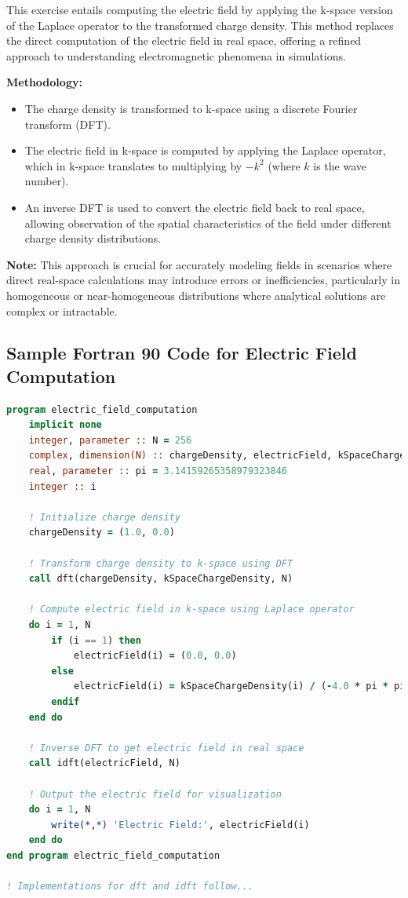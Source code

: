 \documentclass{article}
\begin{document}
This exercise entails computing the electric field by applying the k-space version of the Laplace operator to the transformed charge density. This method replaces the direct computation of the electric field in real space, offering a refined approach to understanding electromagnetic phenomena in simulations.

\vspace{3mm}

\textbf{Methodology:}
\begin{itemize}
    \item The charge density is transformed to k-space using a discrete Fourier transform (DFT).
    \item The electric field in k-space is computed by applying the Laplace operator, which in k-space translates to multiplying by $-k^2$ (where $k$ is the wave number).
    \item An inverse DFT is used to convert the electric field back to real space, allowing observation of the spatial characteristics of the field under different charge density distributions.
\end{itemize}

\textbf{Note:}
This approach is crucial for accurately modeling fields in scenarios where direct real-space calculations may introduce errors or inefficiencies, particularly in homogeneous or near-homogeneous distributions where analytical solutions are complex or intractable.

\subsection*{Sample Fortran 90 Code for Electric Field Computation}
\begin{lstlisting}[language=fortran]
program electric_field_computation
    implicit none
    integer, parameter :: N = 256
    complex, dimension(N) :: chargeDensity, electricField, kSpaceChargeDensity
    real, parameter :: pi = 3.14159265358979323846
    integer :: i

    ! Initialize charge density
    chargeDensity = (1.0, 0.0)

    ! Transform charge density to k-space using DFT
    call dft(chargeDensity, kSpaceChargeDensity, N)

    ! Compute electric field in k-space using Laplace operator
    do i = 1, N
        if (i == 1) then
            electricField(i) = (0.0, 0.0)
        else
            electricField(i) = kSpaceChargeDensity(i) / (-4.0 * pi * pi * (real(i - 1)/real(N))**2)
        endif
    end do

    ! Inverse DFT to get electric field in real space
    call idft(electricField, N)

    ! Output the electric field for visualization
    do i = 1, N
        write(*,*) 'Electric Field:', electricField(i)
    end do
end program electric_field_computation

! Implementations for dft and idft follow...
\end{lstlisting}
\end{document}
